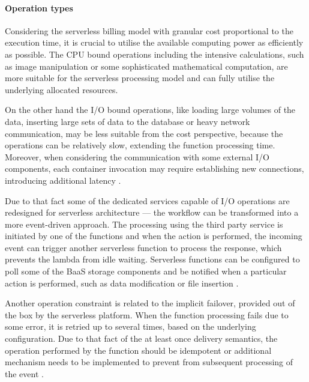\paragraph{Operation types} \label{chapter:serverless-suitability-operation-types}

Considering the serverless billing model with granular cost proportional to the execution time, it is crucial to utilise the available computing power as efficiently as possible. The CPU bound operations including the intensive calculations, such as image manipulation or some sophisticated mathematical computation, are more suitable for the serverless processing model and can fully utilise the underlying allocated resources.

On the other hand the I/O bound operations, like loading large volumes of the data, inserting large sets of data to the database or heavy network communication, may be less suitable from the cost perspective, because the operations can be relatively slow, extending the function processing time. Moreover, when considering the communication with some external I/O components, each container invocation may require establishing new connections, introducing additional latency \cite{LeveragingServerlessCloudComputingArchitectures}.

Due to that fact some of the dedicated services capable of I/O operations are redesigned for serverless architecture --- the workflow can be transformed into a more event-driven approach. The processing using the third party service is initiated by one of the functions and when the action is performed, the incoming event can trigger another serverless function to process the response, which prevents the lambda from idle waiting. Serverless functions can be configured to poll some of the BaaS storage components and be notified when a particular action is performed, such as data modification or file insertion \cite{EvaluationOfServerlessApplicationProgrammingModel}.

Another operation constraint is related to the implicit failover, provided out of the box by the serverless platform. When the function processing fails due to some error, it is retried up to several times, based on the underlying configuration. Due to that fact of the at least once delivery semantics, the operation performed by the function should be idempotent or additional mechanism needs to be implemented to prevent from subsequent processing of the event \cite{EvaluationOfServerlessApplicationProgrammingModel}.

